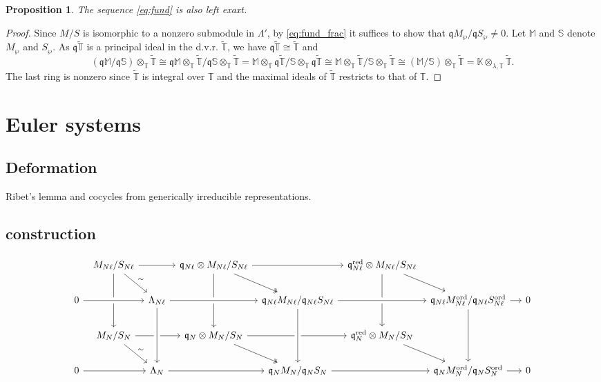 \documentclass[leqno]{amsart}
\newcommand{\TT}{\mathbb{T}} %
\newcommand{\red}{\textnormal{red}}
\newcommand{\ord}{\textnormal{ord}}
\newcommand{\fq}{\mathfrak{q}}
\newtheorem{prop}[thm]{Proposition}
\theoremstyle{definition}
\theoremstyle{remark}
\begin{document}
\begin{prop}
	The sequence \eqref{eq:fund} is also left exaxt.
\end{prop}
\begin{proof}
	Since $M/S$ is isomorphic to a nonzero submodule 
	in  $\Lambda'$,
	by \eqref{eq:fund_frac} it suffices to show that 
	$\fq M_\wp/\fq S_\wp\neq 0$.
	Let $\mathbb{M}$ and  $\mathbb{S}$
	denote  $M_\wp$ and $S_\wp$.
	As $\fq\tilde{\TT}$ is a principal ideal
	in the d.v.r. $\tilde{\TT}$,
	we have $\fq\tilde{\TT}\cong \tilde{\TT}$ and 
\[
	(\fq \mathbb{M}/\fq \mathbb{S})\otimes_\TT
	\tilde{\TT}\cong
	\fq\mathbb{M}\otimes_\TT\tilde{\TT}/
	\fq\mathbb{S}\otimes_\TT\tilde{\TT}=
	\mathbb{M}\otimes_\TT\fq\tilde{\TT}/
	\mathbb{S}\otimes_\TT\fq\tilde{\TT} \cong 
	\mathbb{M}\otimes_\TT\tilde{\TT}/
	\mathbb{S}\otimes_\TT\tilde{\TT}\cong
	(\mathbb{M}/\mathbb{S})\otimes_\TT\tilde{\TT}=
	\mathbb{K}\otimes_{\lambda,\TT}\tilde{\TT}.
\]
The last ring is nonzero since 
$\tilde{\TT}$ is integral over $\TT$
and the maximal ideals of  $ \tilde{\TT}$ 
restricts to that of $\TT$.
\end{proof}

\section{Euler systems}


\subsection{Deformation}

Ribet's lemma 
and cocycles from 
generically irreducible representations.

\subsection{construction}


\begin{equation*}
\begin{tikzcd}[column sep=tiny]
& M_{N\ell}/S_{N\ell}\arrow{dd} \arrow[rd,"\sim"]\arrow[rr]
&& \fq_{N\ell}\otimes M_{N\ell}/S_{N\ell}
	\arrow[rd,twoheadrightarrow]\arrow[rr]\arrow[dd]
&& \fq_{N\ell}^{\red}\otimes M_{N\ell}/S_{N\ell}\arrow[dd]\arrow[rd]\\
0 \arrow[crossing over]{rr} 
&& \Lambda_{N\ell}
	\arrow[crossing over]{dd} \arrow[crossing over]{rr} 
&& \fq_{N\ell}M_{N\ell}/\fq_{N\ell}S_{N\ell}
	\arrow[crossing over]{dd}\arrow[crossing over]{rr} 
&& \fq_{N\ell}M_{N\ell}^{\ord}/\fq_{N\ell}S^{\ord}_{N\ell}
	\arrow{dd} \arrow[rr] && 0\\
& M_{N}/S_{N}\arrow{rr}\arrow[rd,"\sim"]
&& \fq_{N}\otimes M_{N}/S_{N}
	\arrow{rr} \arrow[rd,twoheadrightarrow]
&& \fq_{N}^{\red}\otimes M_{N}/S_{N} \arrow[rd]& & & \\
0 \arrow[crossing over]{rr} 
&& \Lambda_{N} \arrow[crossing over]{rr} 
&& \fq_{N}M_{N}/\fq_{N}S_{N}\arrow[crossing over]{rr} 
&& \fq_{N}M_{N}^{\ord}/\fq_{N}S_{N}^{\ord} \arrow[rr] && 0
\arrow[from=2-3,to=4-3,crossing over]
\arrow[from=2-5,to=4-5,crossing over]
\end{tikzcd}
\end{equation*}
\end{document}
